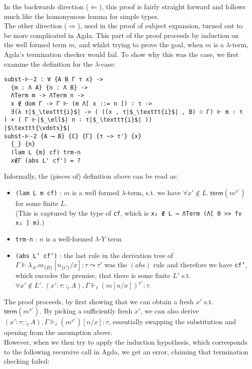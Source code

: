 \documentclass[a4paper, 12pt, twoside]{style/ociamthesis}
\theoremstyle{plain}
\theoremstyle{definition}
\theoremstyle{remark}
\providecommand{\tightlist}{%
  \setlength{\itemsep}{0pt}\setlength{\parskip}{0pt}}
\newcommand{\lamy}{\lambda\text{-}Y}
\newcommand{\trm}{\textsf{term}}
\begin{document}
In the backwards direction (\(\Leftarrow\)), this proof is fairly
straight forward and follows much like the homonymous lemma for simple
types.\\
The other direction (\(\Rightarrow\)), used in the proof of subject
expansion, turned out to be more complicated in Agda. This part of the
proof proceeds by induction on the well formed term \(m\), and whilst
trying to prove the goal, when \(m\) is a \(\lambda\)-term, Agda's
termination checker would fail. To show why this was the case, we first
examine the definition for the \(\lambda\)-case:

\begin{verbatim}
subst-⊩-2 : ∀ {A B Γ τ x} ->
  {m : Λ A} {n : Λ B} -> 
  ΛTerm m -> ΛTerm n ->
  x ∉ dom Γ -> Γ ⊩ (m Λ[ x ::= n ]) ∶ τ ->
  ∃(λ τ|$_\texttt{i}$| -> ( ((x , τ|$_\texttt{i}$| , B) ∷ Γ) ⊩ m ∶ τ ) × ( Γ ⊩|$_\ell$| n ∶ τ|$_\texttt{i}$| ))
|$\texttt{\vdots}$|
subst-⊩-2 {A ⟶ B} {C} {Γ} {τ ~> τ'} {x} 
  {_} {n} 
  (lam L {m} cf) trm-n 
  x∉Γ (abs L' cf') = ?
\end{verbatim}

Informally, the (pieces of) definition above can be read as:

\begin{itemize}
\tightlist
\item
  \texttt{(lam L {m} cf)} : \(m\) is a well formed \(\lambda\)-term,
  s.t. we have \(\forall x' \not\in L.\ \trm(m^{x'})\) for some finite
  \(L\).\\
  (This is captured by the type of \texttt{cf}, which is
  \texttt{x₁ ∉ L → ΛTerm (Λ[ 0 >> fv x₁ ] m)}.)
\item
  \texttt{trm-n} : \(n\) is a well-formed \(\lamy\) term
\item
  \texttt{(abs L' cf')} : the last rule in the derivation tree of
  \(\Gamma \Vdash \lambda_A.m_{\{B\}}[n_{\{C\}}/x] : \tau \leadsto \tau'\)
  was the \((abs)\) rule and therefore we have \texttt{cf'}, which
  encodes the premise, that there is some finite \(L'\) s.t.
  \(\forall x' \not\in L'.\ (x' : \tau ::_\ell A),\Gamma \Vdash_\ell (m[n/x])^{x'} : \tau\).
\end{itemize}

The proof proceeds, by first showing that we can obtain a fresh \(x'\)
s.t. \(\trm(m^{x'})\). By picking a sufficiently fresh \(x'\), we can
also derive
\((x' : \tau ::_\ell A),\Gamma \Vdash_\ell (m^{x'})[n/x] : \tau\),
essentially swapping the substitution and opening from the assumption
above.\\
However, when we then try to apply the induction hypothesis, which
corresponds to the following recursive call in Agda, we get an error,
claiming that termination checking failed:
\end{document}
